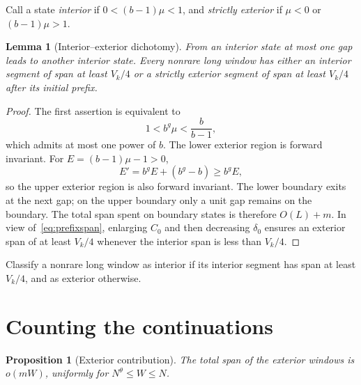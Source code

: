 \documentclass[a4paper,10pt]{amsart}
\newtheorem{lemma}[theorem]{Lemma}
\newtheorem{proposition}[theorem]{Proposition}
\theoremstyle{remark}
\begin{document}
Call a state \emph{interior} if $0<(b-1)\mu<1$, and \emph{strictly
exterior} if $\mu<0$ or $(b-1)\mu>1$.

\begin{lemma}[Interior--exterior dichotomy]\label{lem:dichotomy}
From an interior state at most one gap leads to another interior state.
Every nonrare long window has either an interior segment of span at least
$V_k/4$ or a strictly exterior segment of span at least $V_k/4$ after its
initial prefix.
\end{lemma}

\begin{proof}
The first assertion is equivalent to
\[
 1<b^g\mu<\frac b{b-1},
\]
which admits at most one power of $b$. The lower exterior region is forward
invariant. For $E=(b-1)\mu-1>0$,
\[
 E'=b^gE+(b^g-b)\ge b^gE,
\]
so the upper exterior region is also forward invariant. The lower boundary
exits at the next gap; on the upper boundary only a unit gap remains on the
boundary. The total span spent on boundary states is therefore $O(L)+m$.
In view of~\eqref{eq:prefixspan}, enlarging $C_0$ and then decreasing
$\delta_0$ ensures an exterior span of at least $V_k/4$ whenever the interior
span is less than $V_k/4$.
\end{proof}

Classify a nonrare long window as interior if its interior segment has span
at least $V_k/4$, and as exterior otherwise.

\section{Counting the continuations}

\begin{proposition}[Exterior contribution]\label{prop:exterior}
The total span of the exterior windows is $o(mW)$, uniformly for
$N^\theta\le W\le N$.
\end{proposition}
\end{document}

